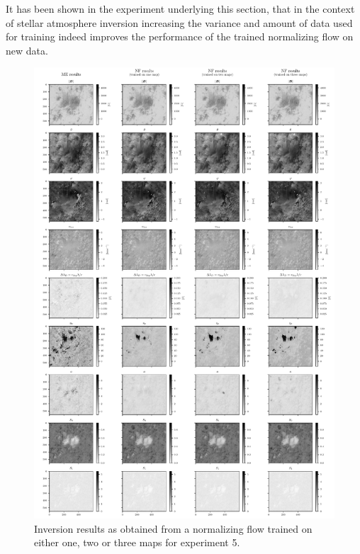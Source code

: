 \documentclass[a4paper,12pt]{report}
\def\lk#1{{\color{black}{#1}}}
\begin{document}
It has been shown in the experiment underlying this section, that in the context of stellar atmosphere inversion\lk{s} increasing the variance and amount of data used for training indeed improves the performance of the trained normalizing flow on new data.

\begin{figure}[h]
\centering
\includegraphics[height=\textheight-1cm]{figures/nf-milne-eddington-example-5-nflows-piecewisequadratic-comp-ME-NF-map19.pdf}
\caption{Inversion results as obtained from a normalizing flow trained on either one, two or three maps for experiment 5.}
\label{fig:nf-milne-eddington-example-5-nflows-piecewisequadratic-comp-ME-NF-map19}
\end{figure}
\end{document}
